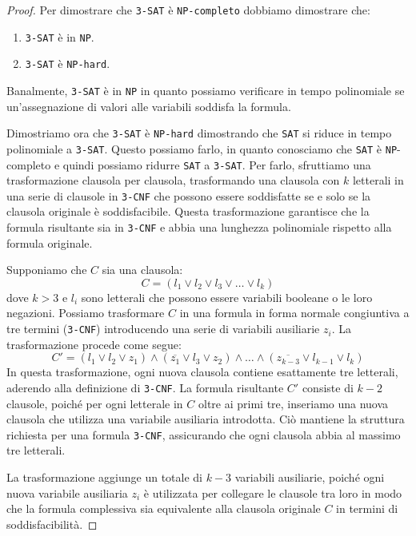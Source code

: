 \begin{proof}
    Per dimostrare che \texttt{3-SAT} è \texttt{NP-completo} dobbiamo dimostrare che:
    \begin{enumerate}
        \item \texttt{3-SAT} è in \texttt{NP}.
        \item \texttt{3-SAT} è \texttt{NP-hard}.
    \end{enumerate}

    Banalmente, \texttt{3-SAT} è in \texttt{NP} in quanto possiamo verificare in tempo
    polinomiale se un'assegnazione di valori alle variabili soddisfa la formula.

    Dimostriamo ora che \texttt{3-SAT} è \texttt{NP-hard} dimostrando che \texttt{SAT}
    si riduce in tempo polinomiale a \texttt{3-SAT}. Questo possiamo farlo, in quanto
    conosciamo che \texttt{SAT} è \texttt{NP}-completo e quindi possiamo ridurre
    \texttt{SAT} a \texttt{3-SAT}. Per farlo, sfruttiamo una trasformazione clausola per
    clausola, trasformando una clausola con $k$ letterali in una serie di clausole in
    \texttt{3-CNF} che possono essere soddisfatte se e solo se la clausola originale è
    soddisfacibile. Questa trasformazione garantisce che la formula risultante sia in
    \texttt{3-CNF} e abbia una lunghezza polinomiale rispetto alla formula originale.

    Supponiamo che $C$ sia una clausola:
    \[
        C = (l_1 \lor l_2 \lor l_3 \lor \ldots \lor l_k)
    \]
    dove $k > 3$ e $l_i$ sono letterali che possono essere variabili booleane o le
    loro negazioni. Possiamo trasformare $C$ in una formula in forma normale congiuntiva
    a tre termini (\texttt{3-CNF}) introducendo una serie di variabili ausiliarie $z_i$.
    La trasformazione procede come segue:
    \[ 
        C' = (l_1 \lor l_2 \lor z_1) \land (\overline{z_1} \lor l_3 \lor z_2) \land \ldots
        \land (\overline{z_{k-3}} \lor l_{k-1} \lor l_k)
    \]
    In questa trasformazione, ogni nuova clausola contiene esattamente tre letterali,
    aderendo alla definizione di \texttt{3-CNF}. La formula risultante $C'$ consiste
    di $k-2$ clausole, poiché per ogni letterale in $C$ oltre ai primi tre, inseriamo
    una nuova clausola che utilizza una variabile ausiliaria introdotta. Ciò mantiene
    la struttura richiesta per una formula \texttt{3-CNF}, assicurando che ogni clausola
    abbia al massimo tre letterali.

    La trasformazione aggiunge un totale di $k-3$ variabili ausiliarie, poiché ogni nuova
    variabile ausiliaria $z_i$ è utilizzata per collegare le clausole tra loro in modo che
    la formula complessiva sia equivalente alla clausola originale $C$ in termini di
    soddisfacibilità.


\end{proof}
